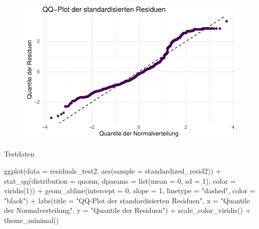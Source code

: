 \documentclass[
  letterpaper,
  DIV=11,
  numbers=noendperiod]{scrartcl}
\newenvironment{Shaded}{\begin{snugshade}}{\end{snugshade}}
\newcommand{\AttributeTok}[1]{\textcolor[rgb]{0.40,0.45,0.13}{#1}}
\newcommand{\DecValTok}[1]{\textcolor[rgb]{0.68,0.00,0.00}{#1}}
\newcommand{\FunctionTok}[1]{\textcolor[rgb]{0.28,0.35,0.67}{#1}}
\newcommand{\NormalTok}[1]{\textcolor[rgb]{0.00,0.23,0.31}{#1}}
\newcommand{\SpecialCharTok}[1]{\textcolor[rgb]{0.37,0.37,0.37}{#1}}
\newcommand{\StringTok}[1]{\textcolor[rgb]{0.13,0.47,0.30}{#1}}
\begin{document}
\begin{figure}[H]

{\centering \includegraphics{main_doc_files/figure-pdf/unnamed-chunk-160-1.pdf}

}

\end{figure}

Testdaten

\begin{Shaded}
\begin{Highlighting}[]
\FunctionTok{ggplot}\NormalTok{(}\AttributeTok{data =}\NormalTok{ residuals\_test2, }\FunctionTok{aes}\NormalTok{(}\AttributeTok{sample =}\NormalTok{ standardized\_resid2)) }\SpecialCharTok{+}
  \FunctionTok{stat\_qq}\NormalTok{(}\AttributeTok{distribution =}\NormalTok{ qnorm, }\AttributeTok{dparams =} \FunctionTok{list}\NormalTok{(}\AttributeTok{mean =} \DecValTok{0}\NormalTok{, }\AttributeTok{sd =} \DecValTok{1}\NormalTok{), }\AttributeTok{color =} \FunctionTok{viridis}\NormalTok{(}\DecValTok{1}\NormalTok{)) }\SpecialCharTok{+}
  \FunctionTok{geom\_abline}\NormalTok{(}\AttributeTok{intercept =} \DecValTok{0}\NormalTok{, }\AttributeTok{slope =} \DecValTok{1}\NormalTok{, }\AttributeTok{linetype =} \StringTok{"dashed"}\NormalTok{, }\AttributeTok{color =} \StringTok{"black"}\NormalTok{) }\SpecialCharTok{+}
  \FunctionTok{labs}\NormalTok{(}\AttributeTok{title =} \StringTok{"QQ{-}Plot der standardisierten Residuen"}\NormalTok{,}
       \AttributeTok{x =} \StringTok{"Quantile der Normalverteilung"}\NormalTok{,}
       \AttributeTok{y =} \StringTok{"Quantile der Residuen"}\NormalTok{) }\SpecialCharTok{+}
  \FunctionTok{scale\_color\_viridis}\NormalTok{() }\SpecialCharTok{+} 
  \FunctionTok{theme\_minimal}\NormalTok{()}
\end{Highlighting}
\end{Shaded}
\end{document}
